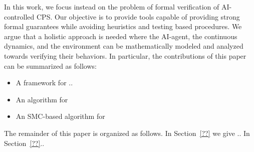 In this work, we focus instead on the problem of formal verification of AI-controlled CPS. Our objective is to provide tools capable of providing strong formal guarantees while avoiding heuristics and testing based procedures. We argue that a holistic approach is needed where the AI-agent, the continuous dynamics, and the environment can be mathematically modeled and analyzed towards verifying their behaviors. In particular, the contributions of this paper can be summarized as follows:
\begin{itemize}
	\item A framework for ..
	\item An algorithm for
	\item An SMC-based algorithm for
\end{itemize}
The remainder of this paper is organized as follows. In Section~\ref{??} we give .. In Section~\ref{??}..









